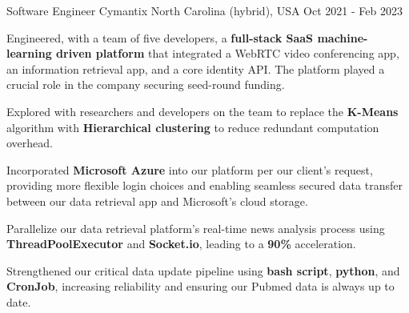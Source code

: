 \begin{cventries}
    \cventry
    {Software Engineer} %
    {Cymantix} %
    {North Carolina (hybrid), USA} %
    {Oct 2021 - Feb 2023} %
    {
      \begin{cvitems} %
        \item {Engineered, with a team of five developers, a \textbf{full-stack SaaS machine-learning driven platform} that integrated a WebRTC video conferencing app, an information retrieval app, and a core identity API. The platform played a crucial role in the company securing seed-round funding.}
        \item {Explored with researchers and developers on the team to replace the \textbf{K-Means} algorithm with \textbf{Hierarchical clustering} to reduce redundant computation overhead.}
        \item {Incorporated \textbf{Microsoft Azure} into our platform per our client's request, providing more flexible login choices and enabling seamless secured data transfer between our data retrieval app and Microsoft's cloud storage.}
        \item {Parallelize our data retrieval platform's real-time news analysis process using \textbf{ThreadPoolExecutor} and \textbf{Socket.io}, leading to a \textbf{90\%} acceleration.}
        \item {Strengthened our critical data update pipeline using \textbf{bash script}, \textbf{python}, and \textbf{CronJob}, increasing reliability and ensuring our Pubmed data is always up to date.}
      \end{cvitems}
    }


\end{cventries}

